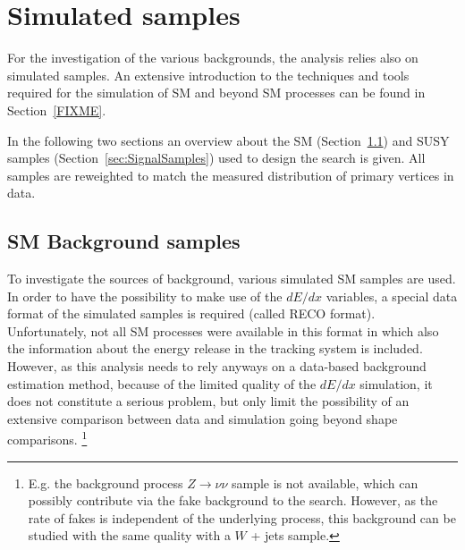 \section{Simulated samples}
\label{sec:SimulatedSamples}

For the investigation of the various backgrounds, the analysis relies also on simulated samples.
An extensive introduction to the techniques and tools required for the simulation of SM and beyond SM processes can be found in Section~\ref{FIXME}.

In the following two sections an overview about the SM (Section~\ref{sec:SMSamples}) and SUSY samples (Section~\ref{sec:SignalSamples}) used to design the search is given.
All samples are reweighted to match the measured distribution of primary vertices in data.

\subsection{SM Background samples}
\label{sec:SMSamples}
To investigate the sources of background, various simulated SM samples are used.
In order to have the possibility to make use of the $dE/dx$ variables, a special data format of the simulated samples is required (called RECO format).
Unfortunately, not all SM processes were available in this format in which also the information about the energy release in the tracking system is included.
However, as this analysis needs to rely anyways on a data-based background estimation method, because of the limited quality of the $dE/dx$ simulation,
it does not constitute a serious problem, but only limit the possibility of an extensive comparison between data and simulation going beyond shape comparisons.
\footnote{E.g. the background process $Z\rightarrow\nu\nu$ sample is not available, which can possibly contribute via the fake background to the search.
However, as the rate of fakes is independent of the underlying process, this background can be studied with the same quality with a $W$ + jets sample.}

